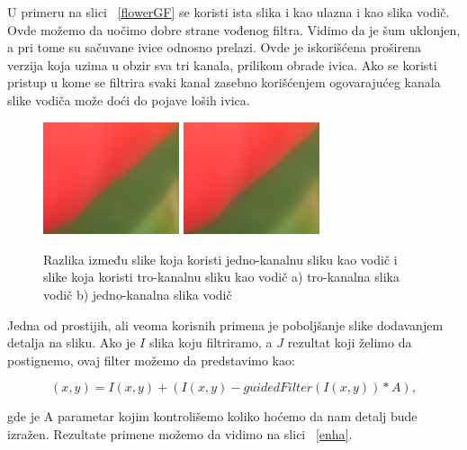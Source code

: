 \documentclass[a4paper,12pt,titlepage]{article}
\begin{document}
U primeru na slici ~\ref{flowerGF} se koristi ista slika i kao ulazna i kao slika vodič. Ovde možemo da uočimo dobre strane vođenog filtra. Vidimo da je šum uklonjen, a pri tome su sačuvane ivice odnosno prelazi. Ovde je iskorišćena proširena verzija koja uzima u obzir sva tri kanala, prilikom obrade ivica. Ako se koristi pristup u kome se filtrira svaki kanal zasebno korišćenjem ogovarajućeg kanala slike vodiča može doći do pojave loših ivica. 

\begin{figure}[ht!]
\centering
\includegraphics[width=40mm]{img/zoom1.png}
\includegraphics[width=40mm]{img/zoom2.png}
\caption{Razlika između slike koja koristi jedno-kanalnu sliku kao vodič i slike koja koristi tro-kanalnu sliku kao vodič a) tro-kanalna slika vodič b) jedno-kanalna slika vodič }
\label{overflow}
\end{figure}

Jedna od prostijih, ali veoma korisnih primena je poboljšanje slike dodavanjem detalja na sliku. Ako je $I$ slika koju filtriramo, a $J$ rezultat koji želimo da postignemo, ovaj filter možemo da predstavimo kao:

\begin{equation}\label{eq:enh}
(x, y) = I(x, y) + (I(x, y) - guidedFilter(I(x, y)) * A),
\end{equation}

gde je A parametar kojim kontrolišemo koliko hoćemo da nam detalj bude izražen. Rezultate primene možemo da vidimo na slici ~\ref{enha}.
\end{document}
